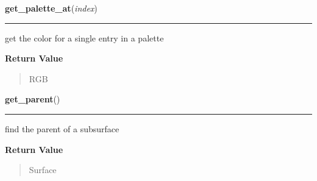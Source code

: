 \hspace{.8\funcindent}\begin{boxedminipage}{\funcwidth}

    \raggedright \textbf{get\_palette\_at}(\textit{index})

    \vspace{-1.5ex}

    \rule{\textwidth}{0.5\fboxrule}
\setlength{\parskip}{2ex}
    get the color for a single entry in a palette

\setlength{\parskip}{1ex}
      \textbf{Return Value}
    \vspace{-1ex}

      \begin{quote}
      RGB

      \end{quote}

    \end{boxedminipage}

    \label{pygame:Surface:get_parent}

    \vspace{0.5ex}

\hspace{.8\funcindent}\begin{boxedminipage}{\funcwidth}

    \raggedright \textbf{get\_parent}()

    \vspace{-1.5ex}

    \rule{\textwidth}{0.5\fboxrule}
\setlength{\parskip}{2ex}
    find the parent of a subsurface

\setlength{\parskip}{1ex}
      \textbf{Return Value}
    \vspace{-1ex}

      \begin{quote}
      Surface

      \end{quote}

    \end{boxedminipage}

    \label{pygame:Surface:get_pitch}

    \vspace{0.5ex}

